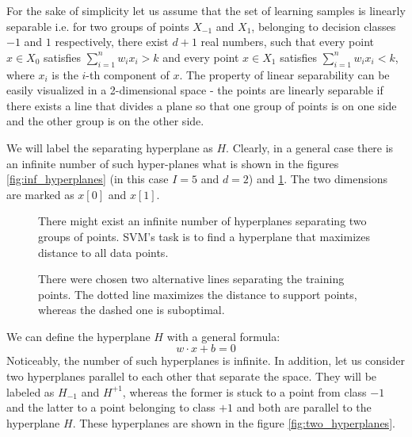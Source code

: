 For the sake of simplicity let us assume that the set of learning samples is linearly separable i.e. for two groups of points $X_{-1}$ and $X_1$, belonging to decision classes $-1$ and $1$ respectively, there exist $d+1$ real numbers, such that every point $x \in X_{0}$ satisfies $\sum^{n}_{i=1}w_ix_i > k$ and every point $x \in X_{1}$ satisfies $\sum^{n}_{i=1}w_ix_i < k$, where $x_i$ is the $i$-th component of $x$. The property of linear separability can be easily visualized in a 2-dimensional space - the points are linearly separable if there exists a line that divides a plane so that one group of points is on one side and the other group is on the other side.

 We will label the separating hyperplane as $H$. Clearly, in a general case there is an infinite number of such hyper-planes what is shown in the figures \ref{fig:inf_hyperplanes} (in this case $I=5$ and $d=2$) and \ref{fig:optimal_and_suboptimal}. The two dimensions are marked as $x[0]$ and $x[1]$.

\begin{figure}[t!]
\centering
\begin{minipage}[t!]{0.45\linewidth}
  
  \caption{There might exist an infinite number of hyperplanes separating two groups of points. SVM's task is to find a hyperplane that maximizes distance to all data points.}
  \label{fig:inf_hyperplanes}
\end{minipage}
\quad
\begin{minipage}[t!]{0.45\linewidth}
  
  \caption{There were chosen two alternative lines separating the training points. The dotted line maximizes the distance to support points, whereas the dashed one is suboptimal.}
  \label{fig:optimal_and_suboptimal}
\end{minipage}
\end{figure}

We can define the hyperplane $H$ with a general formula:
\begin{equation}
w \cdot x+b = 0
\end{equation}
Noticeably, the number of such hyperplanes is infinite. In addition, let us consider two hyperplanes parallel to each other that separate the space. They will be labeled as $H_{-1}$ and $H^{+1}$, whereas the former is stuck to a point from class $-1$ and the latter to a point belonging to class $+1$ and both are parallel to the hyperplane $H$. These hyperplanes are shown in the figure \ref{fig:two_hyperplanes}.

